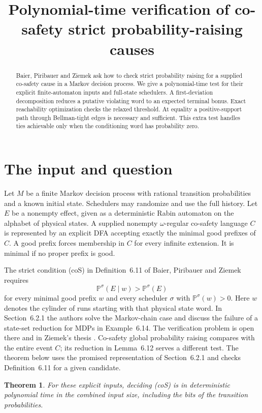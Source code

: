 \documentclass[11pt,a4paper]{amsart}
\title[Checking co-safety strict probability raising]{Polynomial-time verification of co-safety strict probability-raising causes}
\date{}
\newtheorem{theorem}{Theorem}
\newcommand{\Prb}{\mathbb P}
\begin{document}
\begin{abstract}
Baier, Piribauer and Ziemek ask how to check strict probability raising for a supplied co-safety cause in a Markov decision process. We give a polynomial-time test for their explicit finite-automaton inputs and full-state schedulers. A first-deviation decomposition reduces a putative violating word to an expected terminal bonus. Exact reachability optimization checks the relaxed threshold. At equality a positive-support path through Bellman-tight edges is necessary and sufficient. This extra test handles ties achievable only when the conditioning word has probability zero.
\end{abstract}
\maketitle

\section{The input and question}
Let $M$ be a finite Markov decision process with rational transition probabilities and a known initial state. Schedulers may randomize and use the full history. Let $E$ be a nonempty effect, given as a deterministic Rabin automaton on the alphabet of physical states. A supplied nonempty $\omega$-regular co-safety language $C$ is represented by an explicit DFA accepting exactly the minimal good prefixes of $C$. A good prefix forces membership in $C$ for every infinite extension. It is minimal if no proper prefix is good.

The strict condition (coS) in Definition~6.11 of Baier, Piribauer and Ziemek \cite{bpz} requires
\[
     \Prb^\sigma(E\mid w)>\Prb^\sigma(E)
\]
for every minimal good prefix $w$ and every scheduler $\sigma$ with $\Prb^\sigma(w)>0$. Here $w$ denotes the cylinder of runs starting with that physical state word. In Section~6.2.1 the authors solve the Markov-chain case and discuss the failure of a state-set reduction for MDPs in Example~6.14. The verification problem is open there and in Ziemek's thesis \cite[Section~5.3, Remark~104]{ziemek}. Co-safety global probability raising compares with the entire event $C$; its reduction in Lemma~6.12 serves a different test. The theorem below uses the promised representation of Section~6.2.1 and checks Definition~6.11 for a given candidate.

\begin{theorem}
For these explicit inputs, deciding (coS) is in deterministic polynomial time in the combined input size, including the bits of the transition probabilities.
\end{theorem}
\end{document}
